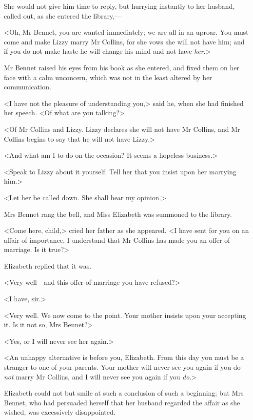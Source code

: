 She would not give him time to reply, but hurrying instantly to her husband, called out, as she entered the library,—

<Oh, Mr Bennet, you are wanted immediately; we are all in an uproar. You must come and make Lizzy marry Mr Collins, for she vows she will not have him; and if you do not make haste he will change his mind and not have \textit{her}.>

Mr Bennet raised his eyes from his book as she entered, and fixed them on her face with a calm unconcern, which was not in the least altered by her communication.

<I have not the pleasure of understanding you,> said he, when she had finished her speech. <Of what are you talking?>

<Of Mr Collins and Lizzy. Lizzy declares she will not have Mr Collins, and Mr Collins begins to say that he will not have Lizzy.>

<And what am I to do on the occasion? It seems a hopeless business.>

<Speak to Lizzy about it yourself. Tell her that you insist upon her marrying him.>

<Let her be called down. She shall hear my opinion.>

Mrs Bennet rang the bell, and Miss Elizabeth was summoned to the library.

<Come here, child,> cried her father as she appeared. <I have sent for you on an affair of importance. I understand that Mr Collins has made you an offer of marriage. Is it true?>

Elizabeth replied that it was.

<Very well—and this offer of marriage you have refused?>

<I have, sir.>

<Very well. We now come to the point. Your mother insists upon your accepting it. Is it not so, Mrs Bennet?>

<Yes, or I will never see her again.>

<An unhappy alternative is before you, Elizabeth. From this day you must be a stranger to one of your parents. Your mother will never see you again if you do \textit{not} marry Mr Collins, and I will never see you again if you \textit{do}.>

Elizabeth could not but smile at such a conclusion of such a beginning; but Mrs Bennet, who had persuaded herself that her husband regarded the affair as she wished, was excessively disappointed.

